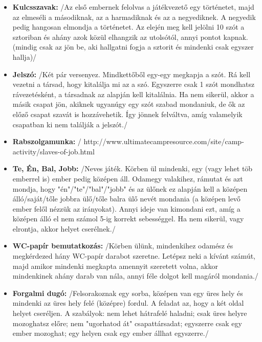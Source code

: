 \documentclass[a4paper, 12pt, twoside, openright]{article}
\begin{document}
\begin{itemize}
\item \textbf{Kulcsszavak:} /Az első embernek felolvas a játékvezető egy történetet, majd az elmeséli a másodiknak, az a harmadiknak és az a negyediknek. A negyedik pedig hangosan elmondja a történetet. Az elején meg kell jelölni 10 szót a sztoriban és ahány azok közül elhangzik az utolsótól, annyi pontot kapnak. (mindig csak az jön be, aki hallgatni fogja a sztorit és mindenki csak egyszer hallja)/

\item \textbf{Jelszó:} /Két pár versenyez. Mindkettőből egy-egy megkapja a szót. Rá kell vezetni a társad, hogy kitalálja mi az a szó. Egyszerre csak 1 szót mondhatsz rávezetésként, a társadnak az alapján kell kitalálnia. Ha nem sikerül, akkor a másik csapat jön, akiknek ugyanúgy egy szót szabad mondaniuk, de ők az előző csapat szavát is hozzávehetik. Így jönnek felváltva, amíg valamelyik csapatban ki nem találják a jelszót./

\item \textbf{Rabszolgamunka:} / http://www.ultimatecampresource.com/site/camp-activity/slaves-of-job.html

\item \textbf{Te, Én, Bal, Jobb:} /Neves játék. Körben ül mindenki, egy (vagy lehet töb emberrel is) ember pedig középen áll. Odamegy valakihez, rámutat és azt mondja, hogy "én"/"te"/"bal"/"jobb" és az ülőnek ez alapján kell a középen álló/saját/tőle jobbra ülő/tőle balra ülő nevét mondania (a középen levő ember felől nézzük az irányokat). Annyi ideje van kimondani ezt, amíg a középen álló el nem számol 5-ig korrekt sebességgel. Ha nem sikerül, vagy elrontja, akkor helyet cserélnek./

\item \textbf{WC-papír bemutatkozás:} /Körben ülünk, mindenkihez odamész és megkérdezed hány WC-papír darabot szeretne. Letépsz neki a kívánt számút, majd amikor mindenki megkapta amennyit szeretett volna, akkor mindenkinek ahány darab van nála, annyi féle dolgot kell magáról mondania./

\item \textbf{Forgalmi dugó:} /Felsorakoznak egy sorba, középen van egy üres hely és mindenki az üres hely felé (középre) fordul. A feladat az, hogy a két oldal helyet cseréljen. A szabályok: nem lehet hátrafelé haladni; csak üres helyre mozoghatsz előre; nem "ugorhatod át" csapattársadat; egyszerre csak egy ember mozoghat; egy helyen csak egy ember állhat egyszerre./


\end{itemize}
\end{document}
